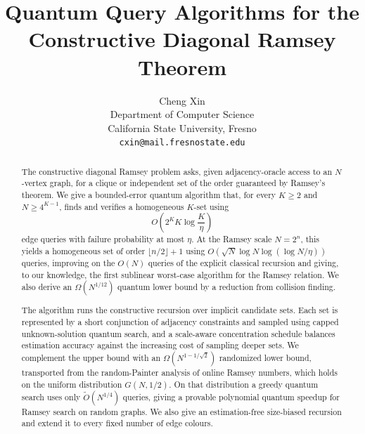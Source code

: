 \documentclass[11pt,a4paper]{article}
\title{Quantum Query Algorithms for the Constructive Diagonal Ramsey Theorem}
\author{Cheng Xin\\[0.4em]\small Department of Computer Science\\\small California State University, Fresno\\\small\texttt{cxin@mail.fresnostate.edu}}
\date{}
\begin{document}
\maketitle

\begin{abstract}
The constructive diagonal Ramsey problem asks, given adjacency-oracle access
to an $N$-vertex graph, for a clique or independent set of the order
guaranteed by Ramsey's theorem.  We give a bounded-error quantum algorithm
that, for every $K\ge2$ and $N\ge4^{K-1}$, finds and verifies a homogeneous
$K$-set using
\[
  O\!\left(2^K K\log\frac K\eta\right)
\]
edge queries with failure probability at most $\eta$.  At the Ramsey scale
$N=2^n$, this yields a homogeneous set of order $\lfloor n/2\rfloor+1$
using $O(\sqrt N\log N\log(\log N/\eta))$ queries, improving on the $O(N)$
queries of the explicit classical recursion and giving, to our knowledge,
the first sublinear worst-case algorithm for the Ramsey relation.
We also derive an $\Omega(N^{1/12})$ quantum lower bound by a reduction
from collision finding.

The algorithm runs the constructive recursion over implicit candidate sets.
Each set is represented by a short conjunction of adjacency constraints and
sampled using capped unknown-solution quantum search, and a scale-aware
concentration schedule balances estimation accuracy against the increasing
cost of sampling deeper sets.  We complement the upper bound with an
$\Omega(N^{1-1/\sqrt2})$ randomized lower bound, transported from the
random-Painter analysis of online Ramsey numbers, which holds on the uniform
distribution $G(N,1/2)$.  On that distribution a greedy quantum search uses
only $\widetilde O(N^{1/4})$ queries, giving a provable polynomial quantum
speedup for Ramsey search on random graphs.  We also give an
estimation-free size-biased recursion and extend it to every fixed number
of edge colours.
\end{abstract}








\clearpage



\clearpage
\appendix




\end{document}
